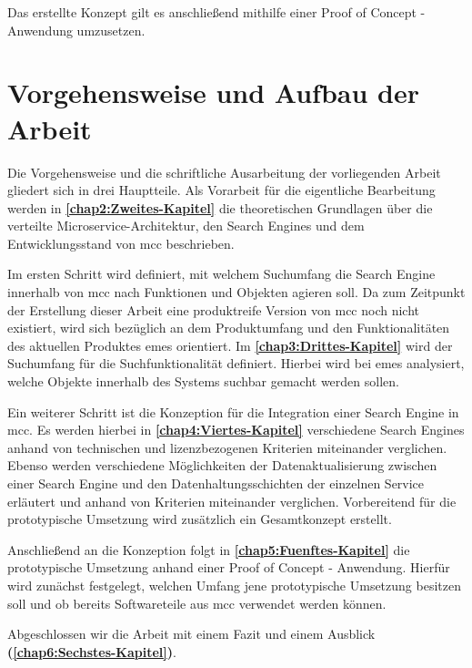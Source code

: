 Das erstellte Konzept gilt es anschließend mithilfe einer Proof of Concept - Anwendung umzusetzen.

\section{Vorgehensweise und Aufbau der Arbeit\label{sec1.3:Unterpunkt-3}}

Die Vorgehensweise und die schriftliche Ausarbeitung der vorliegenden Arbeit gliedert sich in drei Hauptteile. Als Vorarbeit für die eigentliche Bearbeitung werden in \textbf{\autoref{chap2:Zweites-Kapitel}} die theoretischen Grundlagen über die verteilte Microservice-Architektur, den Search Engines und dem Entwicklungsstand von \gls{mcc} beschrieben.

Im ersten Schritt wird definiert, mit welchem Suchumfang die Search Engine innerhalb von \gls{mcc} nach Funktionen und Objekten agieren soll. Da zum Zeitpunkt der Erstellung dieser Arbeit eine produktreife Version von \gls{mcc} noch nicht existiert, wird sich bezüglich an dem Produktumfang und den Funktionalitäten des aktuellen Produktes \gls{emes} orientiert. Im \textbf{\autoref{chap3:Drittes-Kapitel}} wird der Suchumfang für die Suchfunktionalität definiert. Hierbei wird bei \gls{emes} analysiert, welche Objekte innerhalb des Systems \glqq suchbar\grqq{} gemacht werden sollen.

Ein weiterer Schritt ist die Konzeption für die Integration einer Search Engine in \gls{mcc}. Es werden hierbei in \textbf{\autoref{chap4:Viertes-Kapitel}} verschiedene Search Engines anhand von technischen und lizenzbezogenen Kriterien miteinander verglichen. Ebenso werden verschiedene Möglichkeiten der Datenaktualisierung zwischen einer Search Engine und den Datenhaltungsschichten der einzelnen Service erläutert und anhand von Kriterien miteinander verglichen. Vorbereitend für die prototypische Umsetzung wird zusätzlich ein Gesamtkonzept erstellt.

Anschließend an die Konzeption folgt in \textbf{\autoref{chap5:Fuenftes-Kapitel}} die prototypische Umsetzung anhand einer Proof of Concept - Anwendung. Hierfür wird zunächst festgelegt, welchen Umfang jene prototypische Umsetzung besitzen soll und ob bereits Softwareteile aus \gls{mcc} verwendet werden können.

Abgeschlossen wir die Arbeit mit einem Fazit und einem Ausblick \textbf{(\autoref{chap6:Sechstes-Kapitel})}.
